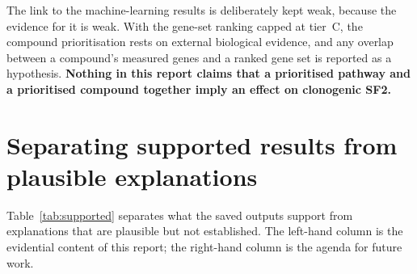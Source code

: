The link to the machine-learning results is deliberately kept weak, because the evidence for
it is weak. With the gene-set ranking capped at tier~C, the compound prioritisation rests on
external biological evidence, and any overlap between a compound's measured genes and a
ranked gene set is reported as a hypothesis. \textbf{Nothing in this report claims that a
prioritised pathway and a prioritised compound together imply an effect on clonogenic SF2.}

\section{Separating supported results from plausible explanations}

Table~\ref{tab:supported} separates what the saved outputs support from explanations that are
plausible but not established. The left-hand column is the evidential content of this report;
the right-hand column is the agenda for future work.

